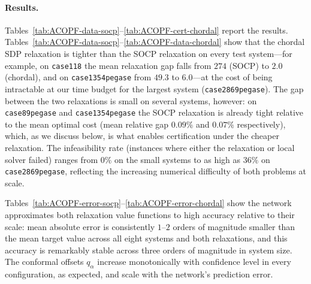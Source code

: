 \documentclass[10pt]{article} %
\theoremstyle{plain}
\theoremstyle{definition}
\theoremstyle{remark}
\begin{document}
\paragraph{Results.} Tables~\ref{tab:ACOPF-data-socp}--\ref{tab:ACOPF-cert-chordal} report the results. Tables~\ref{tab:ACOPF-data-socp}--\ref{tab:ACOPF-data-chordal} show that the chordal SDP relaxation is tighter than the SOCP relaxation on every test system---for example, on \texttt{case118} the mean relaxation gap falls from $274$ (SOCP) to $2.0$ (chordal), and on \texttt{case1354pegase} from $49.3$ to $6.0$---at the cost of being intractable at our time budget for the largest system (\texttt{case2869pegase}). The gap between the two relaxations is small on several systems, however: on \texttt{case89pegase} and \texttt{case1354pegase} the SOCP relaxation is already tight relative to the mean optimal cost (mean relative gap $0.09\%$ and $0.07\%$ respectively), which, as we discuss below, is what enables certification under the cheaper relaxation. The infeasibility rate (instances where either the relaxation or local solver failed) ranges from $0\%$ on the small systems to as high as $36\%$ on \texttt{case2869pegase}, reflecting the increasing numerical difficulty of both problems at scale.

Tables~\ref{tab:ACOPF-error-socp}--\ref{tab:ACOPF-error-chordal} show the network approximates both relaxation value functions to high accuracy relative to their scale: mean absolute error is consistently $1$--$2$ orders of magnitude smaller than the mean target value across all eight systems and both relaxations, and this accuracy is remarkably stable across three orders of magnitude in system size. The conformal offsets $q_\alpha$ increase monotonically with confidence level in every configuration, as expected, and scale with the network's prediction error.
\end{document}
